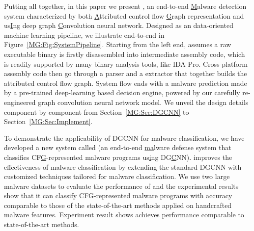 Putting all together, in this paper we present \sysname,
an end-to-end \underline{M}alware detection system characterized by both \underline{A}ttributed control flow \underline{G}raph representation and
us\underline{I}ng deep graph \underline{C}onvolution neural network.
Designed as an data-oriented machine learning pipeline, we illustrate \sysname end-to-end in Figure~\ref{MG:Fig:SystemPipeline}.
Starting from the left end, \sysname assumes a raw executable binary is firstly disassembled into intermediate assembly code,
which is readily supported by many binary analysis tools, like IDA-Pro.
Cross-platform assembly code then go through a parser and a extractor that together builds the attributed control flow graph.
System flow ends with a malware prediction made by a pre-trained deep-learning based decision engine,
powered by our carefully re-engineered graph convolution neural network model.
We unveil the design details component by component from Section~\ref{MG:Sec:DGCNN} to Section~\ref{MG:Sec:Implement}.
\fi

To demonstrate the applicability of DGCNN for malware classification,
we have developed a new system called \sysname (an end-to-end \underline{ma}lware defense system that classifies CF\underline{G}-represented malware programs us\underline{i}ng DG\underline{C}NN).
\sysname improves the effectiveness of malware classification by extending the standard DGCNN with customized techniques tailored for malware classification.
We use two large malware datasets to evaluate the performance of \sysname and the experimental results show that it can classify CFG-represented malware programs with accuracy comparable to those of the state-of-the-art methods applied on handcrafted malware features.
Experiment result shows \sysname achieves performance comparable to state-of-the-art methods.



